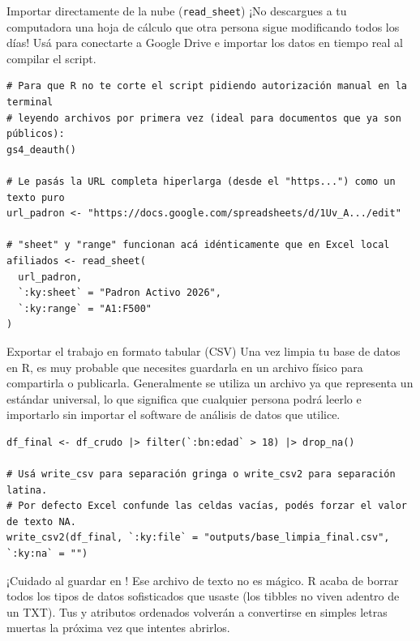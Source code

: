 \documentclass[8pt]{beamer}
\begin{document}
	\begin{frame}[fragile]{Importar directamente de la nube (\texttt{read\_sheet})}
		¡No descargues a tu computadora una hoja de c\'alculo que otra persona sigue modificando todos los días! Usá  para conectarte a Google Drive e importar los datos en tiempo real al compilar el script.
		
\begin{lstlisting}[style=RScript]
# Para que R no te corte el script pidiendo autorización manual en la terminal
# leyendo archivos por primera vez (ideal para documentos que ya son públicos):
gs4_deauth()

# Le pasás la URL completa hiperlarga (desde el "https...") como un texto puro
url_padron <- "https://docs.google.com/spreadsheets/d/1Uv_A.../edit"

# "sheet" y "range" funcionan acá idénticamente que en Excel local
afiliados <- read_sheet(
  url_padron,
  `:ky:sheet` = "Padron Activo 2026",
  `:ky:range` = "A1:F500"
)
\end{lstlisting}
	\end{frame}

	\begin{frame}[fragile]{Exportar el trabajo en formato tabular (CSV)}
		Una vez limpia tu base de datos en R, es muy probable que necesites guardarla en un archivo físico para compartirla o publicarla. Generalmente se utiliza un archivo  ya que representa un estándar universal, lo que significa que cualquier persona podrá leerlo e importarlo sin importar el software de análisis de datos que utilice.
		
\begin{lstlisting}[style=RScript]
df_final <- df_crudo |> filter(`:bn:edad` > 18) |> drop_na()

# Usá write_csv para separación gringa o write_csv2 para separación latina.
# Por defecto Excel confunde las celdas vacías, podés forzar el valor de texto NA.
write_csv2(df_final, `:ky:file` = "outputs/base_limpia_final.csv", `:ky:na` = "")
\end{lstlisting}

\begin{alertblock}{}
¡Cuidado al guardar en ! Ese archivo de texto no es mágico. R acaba de borrar todos los tipos de datos sofisticados que usaste (los tibbles no viven adentro de un TXT). Tus  y atributos ordenados volverán a convertirse en simples letras muertas la próxima vez que intentes abrirlos.
\end{alertblock}
	\end{frame}
\end{document}
